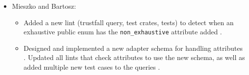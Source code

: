 \documentclass[licencjacka,en]{pracamgr}
\begin{document}
\begin{itemize}
\begin{itemize}

\end{itemize}

	\item Mieszko and Bartosz:
		\begin{itemize}
			\item Added a new lint (trustfall query, test crates, tests) to detect when an exhaustive
				public enum has the \texttt{non\_exhaustive} attribute added \cite{pr_lint_enum_non_exhaustive}.

			\item Designed and implemented a new adapter schema for handling attributes
				\cite{pr_adapter_new_schema_for_attributes}.
				Updated all lints that check attributes to use the new schema, as well as added multiple
				new test cases to the queries \cite{pr_new_schema_for_attributes}.
		\end{itemize}
\end{itemize}



\appendix
\end{document}
